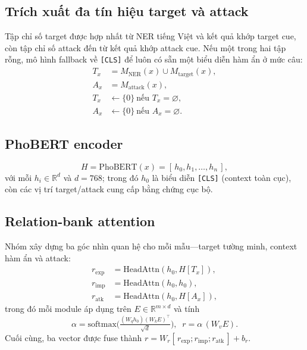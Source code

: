 \documentclass[11pt]{article}
\begin{document}
\subsection{Trích xuất đa tín hiệu target và attack}
Tập chỉ số target được hợp nhất từ NER tiếng Việt và kết quả khớp target cue, còn tập chỉ số attack đến từ kết quả khớp attack cue. Nếu một trong hai tập rỗng, mô hình fallback về \texttt{[CLS]} để luôn có sẵn một biểu diễn hàm ẩn ở mức câu:
\begin{equation}
\begin{aligned}
  T_x &= M_{\mathrm{NER}}(x)\cup M_{\mathrm{target}}(x), \\
  A_x &= M_{\mathrm{attack}}(x), \\
  T_x &\leftarrow \{0\}\ \text{nếu } T_x=\varnothing, \\
  A_x &\leftarrow \{0\}\ \text{nếu } A_x=\varnothing.
\end{aligned}
\end{equation}

\subsection{PhoBERT encoder}
\begin{equation}
  H = \mathrm{PhoBERT}(x) = [\,h_0, h_1, \dots, h_n\,],
\end{equation}
với mỗi $h_i \in \mathbb{R}^{d}$ và $d=768$; trong đó $h_0$ là biểu diễn \texttt{[CLS]} (context toàn cục), còn các vị trí target/attack cung cấp bằng chứng cục bộ.

\subsection{Relation-bank attention}
Nhóm xây dựng ba góc nhìn quan hệ cho mỗi mẫu---target tường minh, context hàm ẩn và attack:
\begin{align}
  r_{\mathrm{exp}} &= \mathrm{HeadAttn}(h_0, H[T_x]), \nonumber\\
  r_{\mathrm{imp}} &= \mathrm{HeadAttn}(h_0, h_0), \\
  r_{\mathrm{atk}} &= \mathrm{HeadAttn}(h_0, H[A_x]), \nonumber
\end{align}
trong đó mỗi module áp dụng trên $E \in \mathbb{R}^{m\times d}$ và tính
\begin{equation}
  \alpha = \mathrm{softmax}\!\Big(\tfrac{(W_q h_0)(W_k E)^\top}{\sqrt d}\Big),\;\; r = \alpha\,(W_v E).
\end{equation}
Cuối cùng, ba vector được fuse thành $r = W_r[\,r_{\mathrm{exp}};r_{\mathrm{imp}};r_{\mathrm{atk}}\,] + b_r$.
\end{document}
